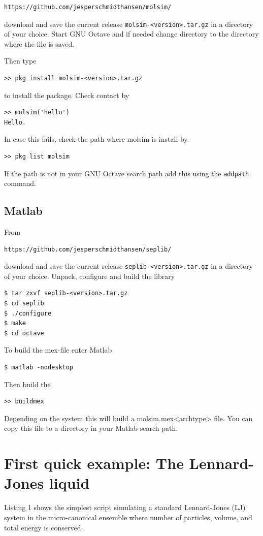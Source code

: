 \documentclass[11pt]{article}
\begin{document}
\begin{verbatim}
https://github.com/jesperschmidthansen/molsim/
\end{verbatim}

\noindent download and save the current release
\verb!molsim-<version>.tar.gz! in a directory of your choice. Start GNU
Octave and if needed change directory to the directory where the file is saved.

\noindent Then type
\begin{verbatim}
>> pkg install molsim-<version>.tar.gz 
\end{verbatim}
to install the package. Check contact by
\begin{verbatim}
>> molsim('hello')
Hello. 
\end{verbatim}
In case this fails, check the path where \textsf{molsim} is install by
\begin{verbatim}
>> pkg list molsim
\end{verbatim}
If the path is not in your GNU Octave search path add this using the
\verb!addpath! command.

\subsection{Matlab}
From
\begin{verbatim}
https://github.com/jesperschmidthansen/seplib/
\end{verbatim}
\noindent download and save the current release \verb!seplib-<version>.tar.gz!
in a directory of your choice. Unpack, configure and build the library
\begin{verbatim}
$ tar zxvf seplib-<version>.tar.gz
$ cd seplib
$ ./configure
$ make
$ cd octave
\end{verbatim}
To build the \textsf{mex}-file enter Matlab
\begin{verbatim}
$ matlab -nodesktop
\end{verbatim}
Then build the 
\begin{verbatim}
>> buildmex
\end{verbatim}
Depending on the system this will build a \textsf{molsim.mex<archtype>}
file. You can copy this file to a directory in your Matlab search path.

\section{First quick example: The Lennard-Jones liquid}
Listing 1 shows the simplest script simulating a standard Lennard-Jones (LJ)
system in the micro-canonical ensemble where number of particles, volume, and
total energy is conserved. 
\end{document}
